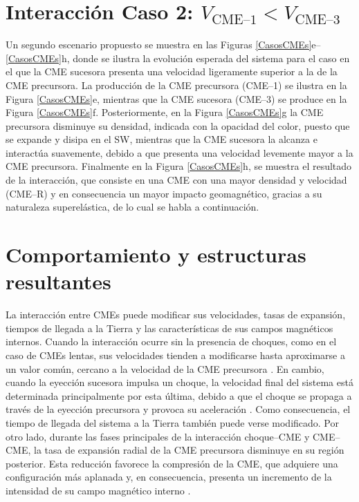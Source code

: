 \section{Interacción Caso 2: $V_{\text{CME--1}} < V_{\text{CME--3}}$}
\label{Caso2}
Un segundo escenario propuesto se muestra en las Figuras \ref{CasosCMEs}e--\ref{CasosCMEs}h, donde se ilustra la evolución esperada del sistema para el caso en el que la CME sucesora presenta una velocidad ligeramente superior a la de la CME precursora. La producción de la CME precursora (CME--1) se ilustra en la Figura \ref{CasosCMEs}e, mientras que la CME sucesora (CME--3) se produce en la Figura \ref{CasosCMEs}f. Posteriormente, en la Figura \ref{CasosCMEs}g la CME precursora disminuye su densidad, indicada con la opacidad del color, puesto que se expande y disipa en el \ac{SW}, mientras que la CME sucesora la alcanza e interactúa suavemente, debido a que presenta una velocidad levemente mayor a la CME precursora. Finalmente en la Figura \ref{CasosCMEs}h, se muestra el resultado de la interacción, que consiste en una CME con una mayor densidad y velocidad (CME--R) y en consecuencia un mayor impacto geomagnético, gracias a su naturaleza superelástica, de lo cual se habla a continuación. 

\section{Comportamiento y estructuras resultantes}
\label{CMEresultante}

La interacción entre CMEs puede modificar sus velocidades, tasas de expansión, tiempos de llegada a la Tierra y las características de sus campos magnéticos internos. Cuando la interacción ocurre sin la presencia de choques, como en el caso de CMEs lentas, sus velocidades tienden a modificarse hasta aproximarse a un valor común, cercano a la velocidad de la CME precursora \parencite[e.g.,][]{wang-2005}. En cambio, cuando la eyección sucesora impulsa un choque, la velocidad final del sistema está determinada principalmente por esta última, debido a que el choque se propaga a través de la eyección precursora y provoca su aceleración \parencite[e.g.,][]{schmidt-2004}. Como consecuencia, el tiempo de llegada del sistema a la Tierra también puede verse modificado. Por otro lado, durante las fases principales de la interacción choque--CME y CME--CME, la tasa de expansión radial de la CME precursora disminuye en su región posterior. Esta reducción favorece la compresión de la CME, que adquiere una configuración más aplanada y, en consecuencia, presenta un incremento de la intensidad de su campo magnético interno \parencite[e.g.,][]{vandas-1997, lugaz-2005, xiong-2006}.


